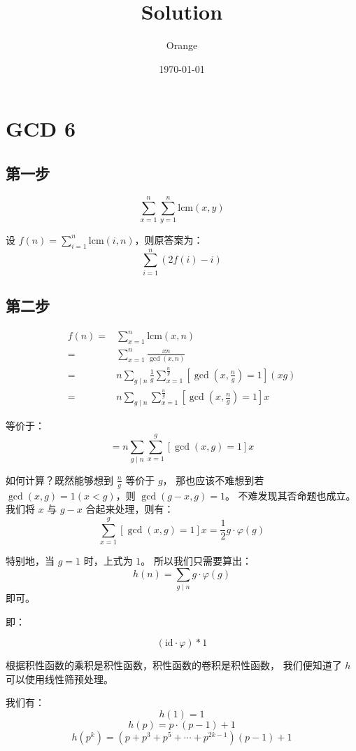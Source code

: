 \documentclass[UTF8]{article}
\title{Solution}
\author{Orange}
\date{\today}
\begin{document}
	\heiti

	\section{GCD 6}

	\subsection{第一步}

	$$
	\sum_{x = 1}^{n} \sum_{y = 1}^{n} \mathrm{lcm}(x, y)
	$$

	设 $f(n) = \sum_{i = 1}^{n} \mathrm{lcm}(i, n)$，则原答案为：
	$$
	\sum_{i = 1}^{n} (2f(i) - i)
	$$

	\subsection{第二步}

	\begin{align*}
		f(n) =&
		\sum_{x = 1}^{n} \mathrm{lcm}(x, n)
		\\=&
		\sum_{x = 1}^{n} \frac {xn} {\gcd(x, n)}
		\\=&
		n
		\sum_{g \mid n} \frac {1} {g}
		\sum_{x = 1}^{\frac {n} {g}} [\gcd(x, \frac {n} {g}) = 1] (xg)
		\\=&
		n
		\sum_{g \mid n}
		\sum_{x = 1}^{\frac {n} {g}} [\gcd(x, \frac {n} {g}) = 1] x
	\end{align*}

	等价于：
	$$
	= n
	\sum_{g \mid n}
	\sum_{x = 1}^{g} [\gcd(x, g) = 1] x
	$$

	如何计算？既然能够想到 $\frac {n} {g}$ 等价于 $g$，
	那也应该不难想到若 $\gcd(x, g) = 1(x < g)$，则 $\gcd(g - x, g) = 1$。
	不难发现其否命题也成立。我们将 $x$ 与 $g - x$ 合起来处理，则有：
	$$
	\sum_{x = 1}^{g} [\gcd(x, g) = 1] x
	= \frac {1} {2} g \cdot \varphi(g)
	$$

	特别地，当 $g = 1$ 时，上式为 $1$。
	所以我们只需要算出：
	$$
	h(n) = \sum_{g \mid n} g \cdot \varphi(g)
	$$
	即可。

	即：

	$$
	(\mathrm {id} \cdot \varphi) * 1
	$$

	根据积性函数的乘积是积性函数，积性函数的卷积是积性函数，
	我们便知道了 $h$ 可以使用线性筛预处理。

	\bigskip
	我们有：
	$$
	h(1) = 1
	$$
	$$
	h(p) = p \cdot (p - 1) + 1
	$$
	$$
	h(p^k) = (p + p^3 + p^5 + \cdots + p^{2k - 1})(p - 1) + 1
	$$
\end{document}
